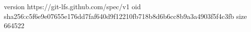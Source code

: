 version https://git-lfs.github.com/spec/v1
oid sha256:c5f6e9e07655e176dd7faf640d9f12210fb718b8d6b6cc8b9a3a4903f5f4c3fb
size 664522
